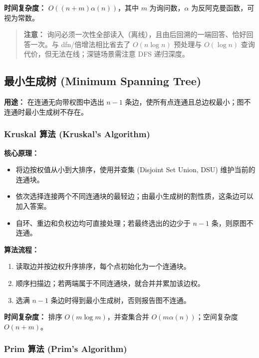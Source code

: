 \textbf{时间复杂度：} $O((n + m)\alpha(n))$，其中 $m$ 为询问数，$\alpha$ 为反阿克曼函数，可视为常数。



\begin{quote}
\textbf{注意：} 询问必须一次性全部读入（离线），且由后回溯的一端回答、恰好回答一次。与 dfn/倍增法相比省去了 $O(n \log n)$ 预处理与 $O(\log n)$ 查询代价，但无法在线；深链场景需注意 DFS 递归深度。
\end{quote}

\subsection{最小生成树 (Minimum Spanning Tree)}

\textbf{用途：} 在连通无向带权图中选出 $n-1$ 条边，使所有点连通且总边权最小；图不连通时最小生成树不存在。

\subsubsection{Kruskal 算法 (Kruskal's Algorithm)}

\textbf{核心原理：}
\begin{itemize}
  \item 将边按权值从小到大排序，使用并查集 (Disjoint Set Union, DSU) 维护当前的连通块。
  \item 依次选择连接两个不同连通块的最轻边；由最小生成树的割性质，这条边可以加入答案。
  \item 自环、重边和负权边均可直接处理；若最终选出的边少于 $n-1$ 条，则原图不连通。
\end{itemize}

\textbf{算法流程：}
\begin{enumerate}
  \item 读取边并按边权升序排序，每个点初始化为一个连通块。
  \item 顺序扫描边；若两端属于不同连通块，就合并并累加该边权。
  \item 选满 $n-1$ 条边时得到最小生成树，否则报告图不连通。
\end{enumerate}

\textbf{时间复杂度：} 排序 $O(m\log m)$，并查集合并 $O(m\alpha(n))$；空间复杂度 $O(n+m)$。



\subsubsection{Prim 算法 (Prim's Algorithm)}

